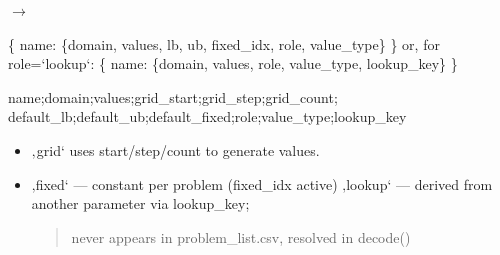 \documentclass[a4paper,11pt,german]{sphinxmanual}
\begin{document}
\begin{fulllineitems}
\label{\detokenize{api/ioh_core:core.ioh_core.import_specs.load_param_defaults}}
\pysigstartsignatures
\pysiglinewithargsret
{}
{}
{{ $\rightarrow$ \DUrole{p}{{[}}\DUrole{p}{{]}}}}
\pysigstopsignatures\begin{description}
\sphinxAtStartPar
\{ name: \{domain, values, lb, ub, fixed\_idx, role, value\_type\} \}
or, for role=‘lookup‘:
\{ name: \{domain, values, role, value\_type, lookup\_key\} \}

\sphinxAtStartPar
name;domain;values;grid\_start;grid\_step;grid\_count;
default\_lb;default\_ub;default\_fixed;role;value\_type;lookup\_key

\end{description}
\begin{itemize}
\item {} \begin{description}
\sphinxAtStartPar
‚grid‘ uses start/step/count to generate values.

\end{description}

\item {} \begin{description}
\sphinxAtStartPar
‚fixed‘  — constant per problem (fixed\_idx active)
‚lookup‘ — derived from another parameter via lookup\_key;
\begin{quote}

\sphinxAtStartPar
never appears in problem\_list.csv, resolved in decode()
\end{quote}

\end{description}


\end{itemize}
\end{fulllineitems}
\end{document}

